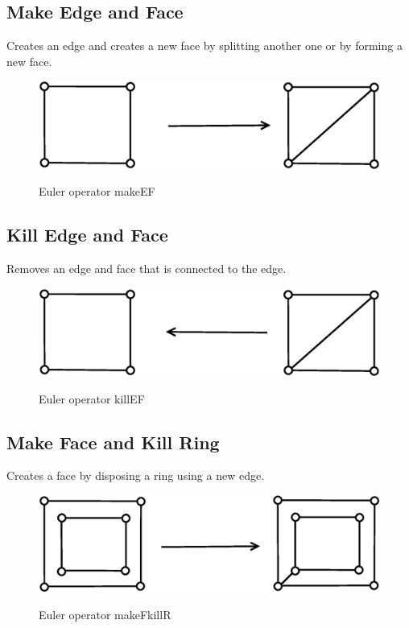 \subsection{Make Edge and Face}

Creates an edge and creates a new face by splitting another one or by forming a new
face.

\begin{figure}[H]
\centering
\includegraphics[scale=0.25]{../img/makeEF.eps}
\label{fig:makeef}
\caption{Euler operator makeEF}
\end{figure}

\subsection{Kill Edge and Face}

Removes an edge and face that is connected to the edge.

\begin{figure}[H]
\centering
\includegraphics[scale=0.25]{../img/killEF.eps}
\label{fig:killef}
\caption{Euler operator killEF}
\end{figure}

\subsection{Make Face and Kill Ring}

Creates a face by disposing a ring using a new edge.

\begin{figure}[H]
\centering
\includegraphics[scale=0.25]{../img/makeFkillR.eps}
\label{fig:makefkillr}
\caption{Euler operator makeFkillR}
\end{figure}

